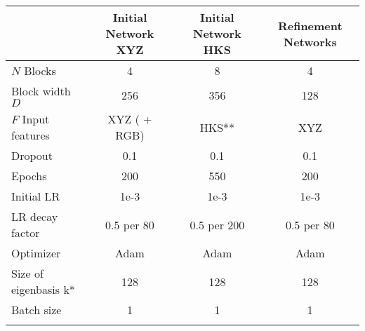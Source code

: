 \documentclass[class=article, crop=false]{standalone}
\begin{document}
\begin{table*}[t]

\centering
\begin{tabular}{l||c|c|c}\toprule
                & Initial Network XYZ & Initial Network HKS                                                                                               & Refinement Networks \\ \hline
$N$ Blocks         & 4                   & 8                                                                                                                 & 4                   \\
Block width $D$    & 256                 & 356                                                                                                               & 128                 \\
$F$ Input features & XYZ ( + RGB)        & HKS**  & XYZ                 \\
Dropout         & 0.1                 & 0.1                                                                                                               & 0.1                 \\
Epochs          & 200                 & 550                                                                                                               & 200                 \\
Initial LR      & 1e-3                & 1e-3                                                                                                              & 1e-3                \\
LR decay factor & 0.5 per 80          & 0.5 per 200                                                                                                       & 0.5 per 80          \\
Optimizer       & Adam                & Adam                                                                                                              & Adam                \\
Size of eigenbasis k*      & 128                 & 128                                                                                                               & 128                 \\
Batch size      & 1                   & 1                                                                                                                 & 1                   \\
                &                     &                                                                                                                   &                  
\end{tabular}
\label{tab:configuration}
\end{table*}
\end{document}
